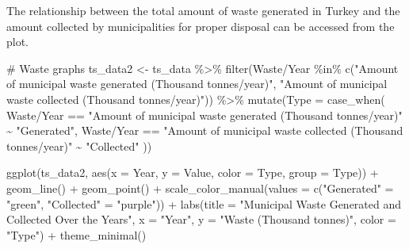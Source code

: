 \documentclass[
  11pt,
  a4paper,
  DIV=11,
  numbers=noendperiod]{scrartcl}
\newenvironment{Shaded}{\begin{snugshade}}{\end{snugshade}}
\newcommand{\AttributeTok}[1]{\textcolor[rgb]{0.40,0.45,0.13}{#1}}
\newcommand{\CommentTok}[1]{\textcolor[rgb]{0.37,0.37,0.37}{#1}}
\newcommand{\FunctionTok}[1]{\textcolor[rgb]{0.28,0.35,0.67}{#1}}
\newcommand{\NormalTok}[1]{\textcolor[rgb]{0.00,0.23,0.31}{#1}}
\newcommand{\OtherTok}[1]{\textcolor[rgb]{0.00,0.23,0.31}{#1}}
\newcommand{\SpecialCharTok}[1]{\textcolor[rgb]{0.37,0.37,0.37}{#1}}
\newcommand{\StringTok}[1]{\textcolor[rgb]{0.13,0.47,0.30}{#1}}
\begin{document}
The relationship between the total amount of waste generated in Turkey
and the amount collected by municipalities for proper disposal can be
accessed from the plot.

\begin{Shaded}
\begin{Highlighting}[]
\CommentTok{\# Waste graphs}
\NormalTok{ts\_data2 }\OtherTok{\textless{}{-}}\NormalTok{ ts\_data }\SpecialCharTok{\%\textgreater{}\%}
  \FunctionTok{filter}\NormalTok{(}\StringTok{\textasciigrave{}}\AttributeTok{Waste/Year}\StringTok{\textasciigrave{}} \SpecialCharTok{\%in\%} \FunctionTok{c}\NormalTok{(}\StringTok{"Amount of municipal waste generated (Thousand tonnes/year)"}\NormalTok{, }
                             \StringTok{"Amount of municipal waste collected (Thousand tonnes/year)"}\NormalTok{)) }\SpecialCharTok{\%\textgreater{}\%}
  \FunctionTok{mutate}\NormalTok{(}\AttributeTok{Type =} \FunctionTok{case\_when}\NormalTok{(}
    \StringTok{\textasciigrave{}}\AttributeTok{Waste/Year}\StringTok{\textasciigrave{}} \SpecialCharTok{==} \StringTok{"Amount of municipal waste generated (Thousand tonnes/year)"} \SpecialCharTok{\textasciitilde{}} \StringTok{"Generated"}\NormalTok{,}
    \StringTok{\textasciigrave{}}\AttributeTok{Waste/Year}\StringTok{\textasciigrave{}} \SpecialCharTok{==} \StringTok{"Amount of municipal waste collected (Thousand tonnes/year)"} \SpecialCharTok{\textasciitilde{}} \StringTok{"Collected"}
\NormalTok{  ))}

\FunctionTok{ggplot}\NormalTok{(ts\_data2, }\FunctionTok{aes}\NormalTok{(}\AttributeTok{x =}\NormalTok{ Year, }\AttributeTok{y =}\NormalTok{ Value, }\AttributeTok{color =}\NormalTok{ Type, }\AttributeTok{group =}\NormalTok{ Type)) }\SpecialCharTok{+}
  \FunctionTok{geom\_line}\NormalTok{() }\SpecialCharTok{+}
  \FunctionTok{geom\_point}\NormalTok{() }\SpecialCharTok{+}
  \FunctionTok{scale\_color\_manual}\NormalTok{(}\AttributeTok{values =} \FunctionTok{c}\NormalTok{(}\StringTok{"Generated"} \OtherTok{=} \StringTok{"green"}\NormalTok{, }\StringTok{"Collected"} \OtherTok{=} \StringTok{"purple"}\NormalTok{)) }\SpecialCharTok{+}
  \FunctionTok{labs}\NormalTok{(}\AttributeTok{title =} \StringTok{"Municipal Waste Generated and Collected Over the Years"}\NormalTok{,}
       \AttributeTok{x =} \StringTok{"Year"}\NormalTok{, }
       \AttributeTok{y =} \StringTok{"Waste (Thousand tonnes)"}\NormalTok{,}
       \AttributeTok{color =} \StringTok{"Type"}\NormalTok{) }\SpecialCharTok{+} 
  \FunctionTok{theme\_minimal}\NormalTok{()}
\end{Highlighting}
\end{Shaded}
\end{document}
